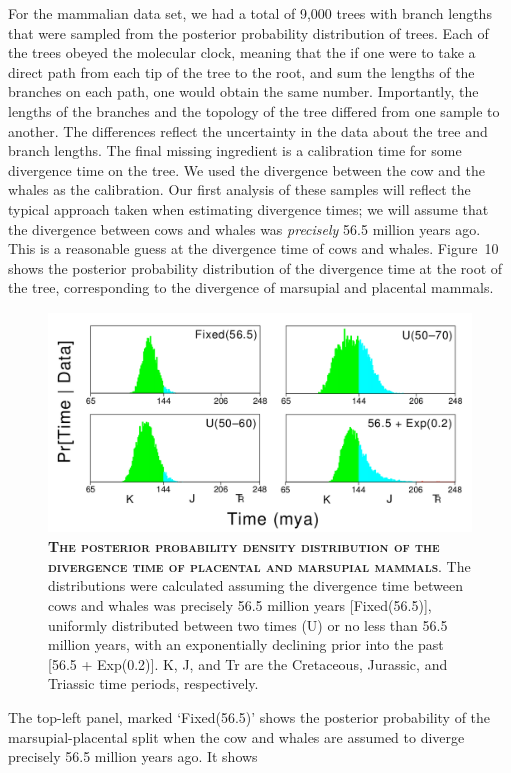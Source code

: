 \documentclass{svmult}
\begin{document}
For the mammalian data set, we had a total of 9,000 trees with branch lengths that were sampled
from the posterior probability distribution of trees. Each of the trees obeyed the molecular clock,
meaning that the if one were to take a direct path from each tip of the tree to the root, and sum
the lengths of the branches on each path, one would obtain the same number. Importantly, the
lengths of the branches and the topology of the tree differed from one sample to another. The
differences reflect the uncertainty in the data about the tree and branch lengths. The final
missing ingredient is a calibration time for some divergence time on the tree. We used the
divergence between the cow and the whales as the calibration. Our first analysis of these samples
will reflect the typical approach taken when estimating divergence times; we will assume that the
divergence between cows and whales was {\it precisely} 56.5 million years ago. This is a reasonable
guess at the divergence time of cows and whales. Figure~10 shows the posterior probability
distribution of the divergence time at the root of the tree, corresponding to the divergence of
marsupial and placental mammals. 
\begin{figure}[t]
\centering
\includegraphics[height=2.3in]{fig10}
\caption{\textbf{\textsc{The posterior probability density distribution of the divergence time of
placental and marsupial mammals}}.
The distributions were calculated assuming the divergence time between cows and whales was
precisely 56.5 million years [Fixed(56.5)], uniformly distributed between two times (U) or no
less than 56.5 million years, with an exponentially declining prior into the past [56.5 +
Exp(0.2)]. K, J, and Tr are the Cretaceous, Jurassic, and Triassic time periods, respectively.}
\label{fig10}
\end{figure}
The top-left panel, marked `Fixed(56.5)' shows the posterior probability of the marsupial-placental
split when the cow and whales are assumed to diverge precisely 56.5 million years ago. It shows
\end{document}
